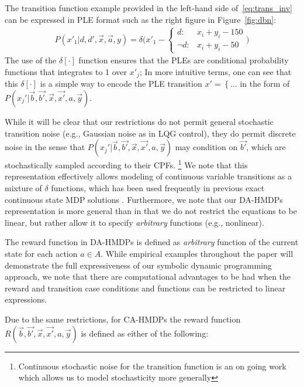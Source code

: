 \documentclass[twoside,11pt]{article}
\begin{document}
The transition function example provided in the left-hand side of~\eqref{eq:trans_inv} can be expressed in PLE format such as the right figure in Figure~\ref{fig:dbn}:
\begin{align*}
P(x'_1 | d, d',\vec{x},\vec{a}, y) = \delta \Bigg( x'_1 -  \begin{cases}
d  : & x_i + y_i - 150 \\
\neg d : & x_i + y_i - 50    
\end{cases} \Bigg) 
\end{align*}
The use of the $\delta[\cdot]$ function ensures that the PLEs are conditional
probability functions that integrates to 1 over $x'_j$; In more intuitive
terms, one can see that this $\delta[\cdot]$ is a simple way to encode
the PLE transition $x' = \left\{ \ldots \right.$ in the form of 
$P(x_j'|\vec{b},\vec{b'},\vec{x},\vec{x'},a,\vec{y})$.

While it will be clear that our restrictions do not permit general stochastic transition noise (e.g., Gaussian noise as in LQG control), they do permit discrete noise in the sense that
$P(x_j'|\vec{b},\vec{b'},\vec{x},\vec{x'},a,\vec{y})$ may condition on
$\vec{b'}$, which are stochastically sampled according to their CPFs.
\footnote{Continuous stochastic noise for the transition function is an on going work which allows us to model stochasticity more generally}
We note that this representation effectively allows modeling of
continuous variable transitions as a mixture of $\delta$ functions,
which has been used frequently in previous exact continuous state MDP
solutions \cite{feng04,hao09}.
Furthermore, we note that our
DA-HMDPs representation is more general than \cite{feng04,li05,hao09} in that
we do not restrict the equations to be linear, but rather
allow it to specify \emph{arbitrary} functions (e.g., nonlinear). 

The reward function in DA-HMDPs is defined as \emph{arbitrary} function of the current state for each action $a \in A$. 
While  empirical examples throughout the paper will demonstrate the full expressiveness of our symbolic dynamic programming approach, we note that there are computational advantages to be had when the reward and transition case conditions and functions can be restricted to linear expressions.  

Due to the same restrictions, for CA-HMDPs the reward function $R(\vec{b},\vec{b'},\vec{x},\vec{x'}, a,\vec{y})$ is defined as either of the following:
\end{document}
